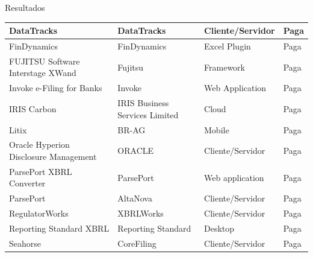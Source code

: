 \documentclass[t,14pt,mathserif]{beamer}
\begin{document}
\begin{frame}{Resultados}
\begin{table}[htb]
{\begin{tabular}{|l|l|l|l|}
DataTracks                                        & DataTracks                                  & Cliente/Servidor                          & Paga                                  \\ \hline
FinDynamics                                       & FinDynamics                                 & Excel Plugin                              & Paga                                  \\ \hline
FUJITSU Software Interstage XWand                 & Fujitsu                                     & Framework                                 & Paga                                  \\ \hline
Invoke e-Filing for Banks                         & Invoke                                      & Web Application                           & Paga                                  \\ \hline
IRIS Carbon                                       & IRIS Business Services Limited              & Cloud                                     & Paga                                  \\ \hline
Litix                                             & BR-AG                                       & Mobile                                    & Paga                                  \\ \hline
Oracle Hyperion Disclosure Management             & ORACLE                                      & Cliente/Servidor                          & Paga                                  \\ \hline
ParsePort XBRL Converter                          & ParsePort                                   & Web application                           & Paga                                  \\ \hline
ParsePort                                         & AltaNova                                    & Cliente/Servidor                          & Paga                                  \\ \hline
RegulatorWorks                                    & XBRLWorks                                   & Cliente/Servidor                          & Paga                                  \\ \hline
Reporting Standard XBRL                           & Reporting Standard                          & Desktop                                   & Paga                                  \\ \hline
Seahorse                                          & CoreFiling                                  & Cliente/Servidor                          & Paga                                  \\ \hline

\end{tabular}}
\end{table}
\end{frame}
\end{document}

